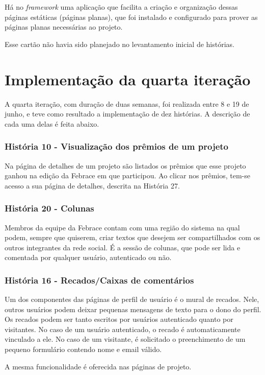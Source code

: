 \documentclass[a4paper,12pt,font=plain,header=plain]{abnt}
\begin{document}
      Há no \textit{framework} uma aplicação que facilita a criação e organização dessas páginas estáticas (páginas planas), que foi instalado e configurado para prover as páginas planas necessárias ao projeto.

  Esse cartão não havia sido planejado no levantamento inicial de histórias.

  \section{Implementação da quarta iteração}
    A quarta iteração, com duração de duas semanas, foi realizada entre 8 e 19 de junho, e teve como resultado a implementação de dez histórias. A descrição de cada uma delas é feita abaixo.

    \subsubsection{História 10 - Visualização dos prêmios de um projeto}
      Na página de detalhes de um projeto são listados os prêmios que esse projeto ganhou na edição da Febrace em que participou. Ao clicar nos prêmios, tem-se acesso a sua página de detalhes, descrita na História 27.

    \subsubsection{História 20 - Colunas}
      Membros da equipe da Febrace contam com uma região do sistema na qual podem, sempre que quiserem, criar textos que desejem ser compartilhados com os outros integrantes da rede social. É a sessão de colunas, que pode ser lida e comentada por qualquer usuário, autenticado ou não.

    \subsubsection{História 16 - Recados/Caixas de comentários}
      Um dos componentes das páginas de perfil de usuário é o mural de recados. Nele, outros usuários podem deixar pequenas mensagens de texto para o dono do perfil. Os recados podem ser tanto escritos por usuários autenticado quanto por visitantes. No caso de um usuário autenticado, o recado é automaticamente vinculado a ele. No caso de um visitante, é solicitado o preenchimento de um pequeno formulário contendo nome e email válido.

      A mesma funcionalidade é oferecida nas páginas de projeto.
\end{document}
